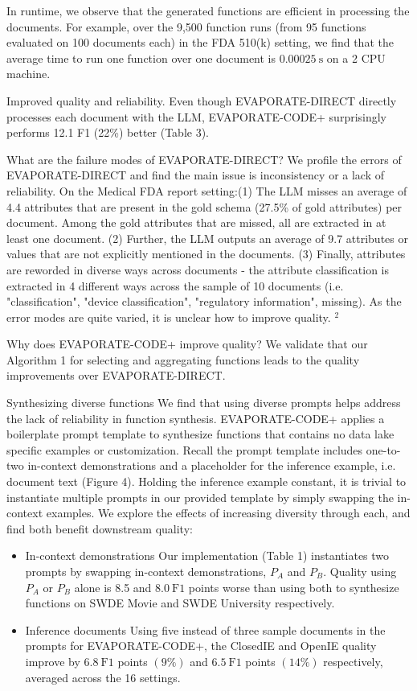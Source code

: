 \documentclass[10pt]{article}
\begin{document}
In runtime, we observe that the generated functions are efficient in processing the documents. For example, over the 9,500 function runs (from 95 functions evaluated on 100 documents each) in the FDA 510(k) setting, we find that the average time to run one function over one document is $0.00025 \mathrm{~s}$ on a 2 CPU machine.

Improved quality and reliability. Even though EVAPORATE-DIRECT directly processes each document with the LLM, EVAPORATE-CODE+ surprisingly performs 12.1 F1 (22\%) better (Table 3).

What are the failure modes of EVAPORATE-DIRECT? We profile the errors of EVAPORATE-DIRECT and find the main issue is inconsistency or a lack of reliability. On the Medical FDA report setting:(1) The LLM misses an average of 4.4 attributes that are present in the gold schema (27.5\% of gold attributes) per document. Among the gold attributes that are missed, all are extracted in at least one document. (2) Further, the LLM outputs an average of 9.7 attributes or values that are not explicitly mentioned in the documents. (3) Finally, attributes are reworded in diverse ways across documents - the attribute classification is extracted in 4 different ways across the sample of 10 documents (i.e. "classification", "device classification", "regulatory information", missing). As the error modes are quite varied, it is unclear how to improve quality. ${ }^{2}$

Why does EVAPORATE-CODE+ improve quality? We validate that our Algorithm 1 for selecting and aggregating functions leads to the quality improvements over EVAPORATE-DIRECT.

Synthesizing diverse functions We find that using diverse prompts helps address the lack of reliability in function synthesis. EVAPORATE-CODE+ applies a boilerplate prompt template to synthesize functions that contains no data lake specific examples or customization. Recall the prompt template includes one-to-two in-context demonstrations and a placeholder for the inference example, i.e. document text (Figure 4). Holding the inference example constant, it is trivial to instantiate multiple prompts in our provided template by simply swapping the in-context examples. We explore the effects of increasing diversity through each, and find both benefit downstream quality:

\begin{itemize}
  \item In-context demonstrations Our implementation (Table 1) instantiates two prompts by swapping in-context demonstrations, $P_{A}$ and $P_{B}$. Quality using $P_{A}$ or $P_{B}$ alone is 8.5 and $8.0 \mathrm{~F} 1$ points worse than using both to synthesize functions on SWDE Movie and SWDE University respectively.

  \item Inference documents Using five instead of three sample documents in the prompts for EVAPORATE-CODE+, the ClosedIE and OpenIE quality improve by $6.8 \mathrm{~F} 1$ points $(9 \%)$ and $6.5 \mathrm{~F} 1$ points $(14 \%)$ respectively, averaged across the 16 settings.

\end{itemize}
\end{document}
